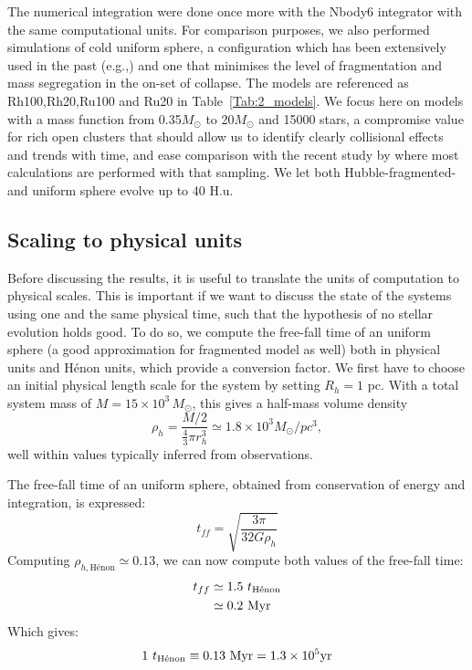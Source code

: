 The numerical integration were done once more with the Nbody6 integrator with the same computational units. For comparison purposes, we also performed simulations of cold uniform sphere, a configuration which has been extensively used  in the past (e.g.,\citealt{Theis1999,Boily2002,Barnes2009,Caputo2014,Benhaiem2015}) and one that minimises the level of fragmentation and mass segregation in the on-set of collapse. The models are referenced as Rh100,Rh20,Ru100 and Ru20 in Table~\ref{Tab:2_models}. We focus here on models with a mass function from 0.35$M_\odot$ to 20$M_\odot$ and 15000 stars, a compromise value for rich open clusters that should allow us to identify clearly collisional effects and trends with time, and ease comparison with the recent study by \cite{Caputo2014} where most calculations are performed with that sampling. We let both Hubble-fragmented- and uniform sphere evolve up to 40 H.u. 





\subsection{Scaling to physical units}
\label{Sec:3_Scaling}
Before discussing the results, it is useful to translate the units of computation to physical scales. This is important if we want to discuss the state of the systems using one and the same physical time, such that the hypothesis of no stellar evolution holds good.
To do so, we compute the free-fall time of an uniform sphere (a good approximation for fragmented model as well) both in physical units and H\'enon units, which provide a conversion factor. We first have to choose an initial physical length scale for the system by setting $R_h = 1$ pc. With a total system mass of $M = 15\times 10^3\, M_\odot$, this gives a half-mass volume density 
\begin{equation}
\rho_h = \frac{M/2}{\frac{4}{3}\pi r_h^3}  \simeq 1.8 \times10^3 M_\odot / pc^3,
\end{equation}
well within values typically inferred from observations.

 The free-fall time of an uniform sphere, obtained from conservation of energy and integration, is expressed:
\begin{equation}
t_{ff} = \sqrt{\frac{3\pi}{32 G \rho_{h	}}}
\end{equation}
Computing $\rho_{h,\textrm{H\'enon}} \simeq 0.13$, we can now compute both values of the free-fall time:
\begin{align}
t_{ff} &\simeq 1.5~ t_{\textrm{H\'enon}}\\
	   &\simeq 0.2~ {\textrm{Myr}}
\end{align}
Which gives: 
\begin{equation}
1 ~ t_{\textrm{H\'enon}} \equiv 0.13~ {\textrm{Myr}} = 1.3 \times 10^5 {\textrm{yr}} 
\end{equation}


